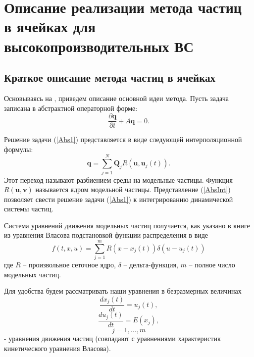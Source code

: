 \chapter{Описание реализации метода частиц в ячейках для высокопроизводительных ВС}
\label{chapt1}

\section{Краткое описание метода частиц в ячейках}
\label{beam-plasma-methods}


Основываясь на
\cite{VshivkovPICbook}, приведем описание основной идеи метода. Пусть задача записана 
в абстрактной операторной форме:
\begin{equation}
\label{Abs1}
\frac{\partial \textbf{q}}{\partial t} + A\textbf{q} = 0.
\end{equation}

Решение задачи (\ref{Abs1}) представляется в виде следующей интерполяционной 
формулы:
\begin{equation}
\label{AbsInt}
\textbf{q} = \sum\limits^{N}_{j=1}\textbf{Q}_j R(\textbf{u},\textbf{u}_j(t)).
\end{equation}
Этот переход называют разбиением среды на модельные частицы. Функция 
$R(\textbf{u},\textbf{v})$ называется ядром модельной частицы. Представление
(\ref{AbsInt}) позволяет свести решение задачи 
(\ref{Abs1}) к интегрированию динамической системы частиц.


\quad Система уравнений движения модельных частиц получается, как указано в книге
\cite{VshivkovPICbook} из уравнения Власова подстановкой функции
распределения в виде
\begin{equation}\label{fr}
f(t,x,u)=\sum_{j=1}^m R(x-x_j(t))\delta(u-u_j(t))
\end{equation}
где $R$ -- произвольное сеточное ядро,  %
$\delta$ -- дельта-функция, $m$ -- полное число модельных частиц.

Для удобства будем рассматривать наши уравнения в безразмерных
величинах
\begin{equation}\label{dx}
\frac{dx_j(t)}{dt}=u_j(t),
\end{equation}
\begin{equation}\label{du}
\frac{du_j(t)}{dt}=E(x_j),
\end{equation}
\begin{displaymath}
j=1,\ldots, m
\end{displaymath}
- уравнения движения частиц (совпадают с уравнениями характеристик
кинетического уравнения Власова).

